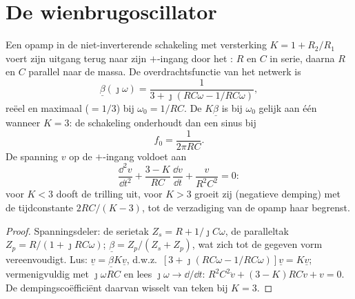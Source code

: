 \section{De wienbrugoscillator}

\begin{proposition}[Wienbrugoscillator]\label{prop:b2:feedback-oscillators:wien}
Een opamp in de niet-inverterende schakeling met versterking
$K = 1 + R_2/R_1$ voert zijn uitgang terug naar zijn $+$-ingang door het
\emph{}: $R$ en $C$ in serie, daarna $R$ en $C$ parallel naar de
massa. De overdrachtsfunctie van het netwerk is
\[
\underline\beta(\jmath\omega) = \frac1{3 + \jmath(RC\omega - 1/RC\omega)} ,
\]
reëel en maximaal ($= 1/3$) bij $\omega_0 = 1/RC$. De 
$K\underline\beta$ is bij $\omega_0$ gelijk aan één wanneer $K = 3$: de
schakeling onderhoudt dan een sinus bij
\[
f_0 = \frac1{2\pi RC} .
\]
De spanning $v$ op de $+$-ingang voldoet aan
\[
\frac{\dd^2v}{\dd t^2} + \frac{3 - K}{RC}\,\frac{\dd v}{\dd t} + \frac{v}{R^2C^2} = 0 :
\]
voor $K < 3$ dooft de trilling uit, voor $K > 3$ groeit zij (negatieve
demping) met de tijdconstante $2RC/(K - 3)$, tot de verzadiging van de opamp
haar begrenst.
\end{proposition}

\begin{proof}
Spanningsdeler: de serietak $Z_s = R + 1/\jmath C\omega$, de paralleltak
$Z_p = R/(1 + \jmath RC\omega)$; $\underline\beta = Z_p/(Z_s + Z_p)$, wat
zich tot de gegeven vorm vereenvoudigt. Lus:
$\underline v = \underline\beta K\underline v$, d.w.z.\
$[3 + \jmath(RC\omega - 1/RC\omega)]\underline v = K\underline v$;
vermenigvuldig met $\jmath\omega RC$ en lees $\jmath\omega \to \dd/\dd t$:
$R^2C^2\ddot v + (3 - K)RC\dot v + v = 0$. De dempingscoëfficiënt daarvan
wisselt van teken bij $K = 3$.
\end{proof}

